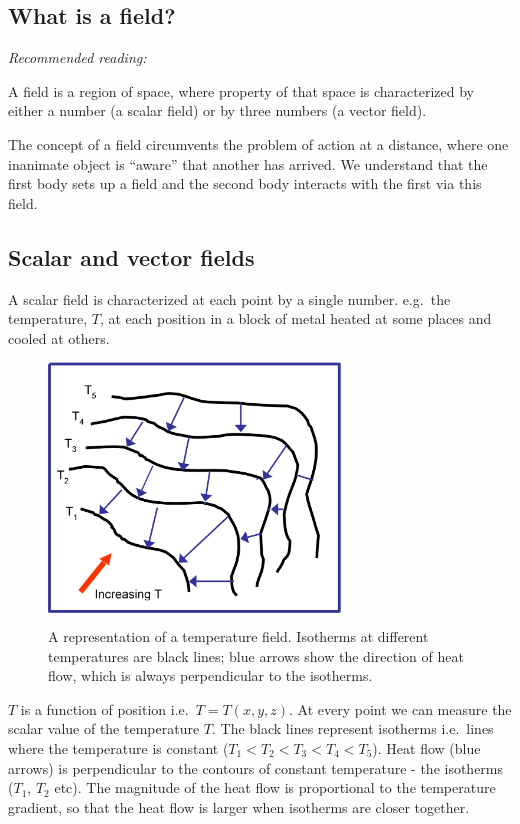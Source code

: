 \documentclass[
  letterpaper,
  DIV=11,
  numbers=noendperiod]{scrreprt}
\begin{document}
\subsection{What is a field?}\label{what-is-a-field}

\emph{Recommended reading:}

A field is a region of space, where property of that space is
characterized by either a number (a scalar field) or by three numbers (a
vector field).

The concept of a field circumvents the problem of action at a distance,
where one inanimate object is ``aware'' that another has arrived. We
understand that the first body sets up a field and the second body
interacts with the first via this field.

\subsection{Scalar and vector fields}\label{scalar-and-vector-fields}

A scalar field is characterized at each point by a single number.
e.g.~the temperature, \(T\), at each position in a block of metal heated
at some places and cooled at others.

\begin{figure}[H]

{\centering \includegraphics[width=80mm,height=\textheight]{Figures/isotherms.png}

}

\caption{A representation of a temperature field. Isotherms at different
temperatures are black lines; blue arrows show the direction of heat
flow, which is always perpendicular to the isotherms.}

\end{figure}%

\(T\) is a function of position i.e.~\(T = T(x,y,z)\). At every point we
can measure the scalar value of the temperature \(T\). The black lines
represent isotherms i.e.~lines where the temperature is constant
(\(T_1 < T_2 < T_3 < T_4 < T_5\)). Heat flow (blue arrows) is
perpendicular to the contours of constant temperature - the isotherms
(\(T_1\), \(T_2\) etc). The magnitude of the heat flow is proportional
to the temperature gradient, so that the heat flow is larger when
isotherms are closer together.
\end{document}
